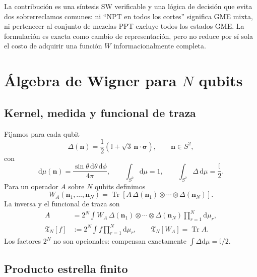 \documentclass[11pt,a4paper]{article}
\newcommand{\Tr}{\operatorname{Tr}}
\newcommand{\id}{\mathbb I}
\newcommand{\Tfun}{\mathfrak T}
\newcommand{\dd}{\mathrm d}
\theoremstyle{definition}
\begin{document}
La contribución es una síntesis SW verificable y una lógica de decisión que
evita dos sobrerreclamos comunes: ni ``NPT en todos los cortes'' significa GME
mixta, ni pertenecer al conjunto de mezclas PPT excluye todos los estados GME.
La formulación es exacta como cambio de representación, pero no reduce por sí
sola el costo de adquirir una función $W$ informacionalmente completa.

\section{Álgebra de Wigner para \texorpdfstring{$N$}{N} qubits}

\subsection{Kernel, medida y funcional de traza}

Fijamos para cada qubit
\begin{equation}
 \Delta(\bm n)=\frac12\left(\id+\sqrt3\,\bm n\cdot\bm\sigma\right),
 \qquad \bm n\in S^2,
 \label{eq:kernel}
\end{equation}
con
\begin{equation}
 \dd\mu(\bm n)=\frac{\sin\theta\,\dd\theta\,\dd\phi}{4\pi},
 \qquad \int_{S^2}\dd\mu=1,
 \qquad \int_{S^2}\Delta\,\dd\mu=\frac{\id}{2}.
 \label{eq:measure}
\end{equation}
Para un operador $A$ sobre $N$ qubits definimos
\begin{equation}
 W_A(\bm n_1,\ldots,\bm n_N)
 =\Tr\!\left[A\,\Delta(\bm n_1)\otimes\cdots\otimes\Delta(\bm n_N)\right].
 \label{eq:SWmap}
\end{equation}
La inversa y el funcional de traza son
\begin{align}
 A&=2^N\int W_A\,\Delta(\bm n_1)\otimes\cdots\otimes\Delta(\bm n_N)
       \prod_{r=1}^{N}\dd\mu_r,\label{eq:inverse}\\
 \Tfun_N[f]&:=2^N\int f\prod_{r=1}^{N}\dd\mu_r,
 \qquad \Tfun_N[W_A]=\Tr A.\label{eq:tracefun}
\end{align}
Los factores $2^N$ no son opcionales: compensan exactamente
$\int\Delta\dd\mu=\id/2$.

\subsection{Producto estrella finito}
\end{document}
